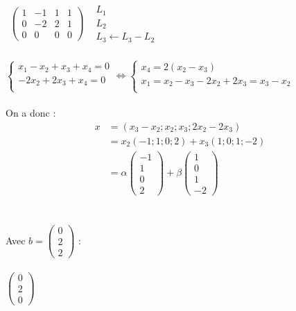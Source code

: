 \documentclass[11pt, fleqn]{report}
\begin{document}
\\
\\
$ \begin{array}{cc}
	\left(\begin{array}{cccc}
		1 & -1 & 1 & 1 \\
		0 & -2 & 2 & 1 \\
		0 & 0 & 0 & 0 
	\end{array}\right)
	&
	\begin{array}{l}
		L_1 \\
		L_2  \\
		L_3 \leftarrow L_3-L_2
	\end{array}	
\end{array} $	
\\
\\
$ \begin{cases}
	x_1-x_2+x_3+x_4=0\\
	-2x_2+2x_3+x_4=0\\
\end{cases} 
\Leftrightarrow
\begin{cases}
	x_4=2(x_2-x_3)\\
	x_1=x_2-x_3-2x_2+2x_3=x_3-x_2\\
\end{cases}$
\\
\\
On a donc : 
\begin{align*} 
	x
	&= (x_3-x_2 ; x_2 ; x_3 ; 2x_2-2x_3)\\
	&= x_2(-1;1;0;2) + x_3(1;0;1;-2)\\
	&= \alpha \left(\begin{array}{l} -1\\1\\0\\2 \end{array}\right) + \beta \left(\begin{array}{l} 1\\0\\1\\-2 \end{array} \right)
\end{align*} 
\\
\\
Avec $ b = \left(\begin{array}{c}0 \\2 \\2\end{array}\right) $ :
\\
\\
$ \left(\begin{array}{c}0 \\2 \\0\end{array}\right) $
\end{document}
